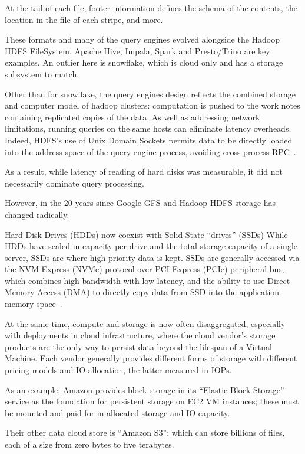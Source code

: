 \documentclass[manuscript]{acmart}
\begin{document}
At the tail of each file, footer information defines the schema of the contents, the location in the file of each stripe, and more.

These formats and many of the query engines evolved alongside the Hadoop HDFS FileSystem.
Apache Hive, Impala, Spark and Presto/Trino are key examples.
An outlier here is snowflake, which is cloud only and has a storage subsystem to match.

Other than for snowflake, the query engines design reflects the combined storage and computer
model of hadoop clusters: computation is pushed to the work notes containing replicated copies of
the data.
As well as addressing network limitations, running queries on the same hosts can
eliminate latency overheads.
Indeed, HDFS's use of Unix Domain Sockets permits data to be directly loaded into the address
space of the query engine process, avoiding cross process RPC~\cite{hdfs-short-circuit-local-reads}.

As a result, while latency of reading of hard disks was measurable, it did not necessarily dominate query processing.

However, in the 20 years since Google GFS and Hadoop HDFS storage has changed radically.

Hard Disk Drives (HDDs) now coexist with Solid State ``drives'' (SSDs)
While HDDs have scaled in capacity per drive and the total storage capacity of a single server,
SSDs are where high priority data is kept.
SSDs are generally accessed via the NVM Express (NVMe) protocol over PCI Express (PCIe) peripheral bus, which
combines high bandwidth with low latency, and the ability to use Direct Memory Access (DMA) to directly copy
data from SSD into the application memory space~\cite{app13020960}.

At the same time, compute and storage is now often disaggregated, especially with deployments
in cloud infrastructure, where the cloud vendor's storage products are the only way to
persist data beyond the lifespan of a Virtual Machine.
Each vendor generally provides different forms of storage with different pricing models and IO allocation,
the latter measured in IOPs.

As an example, Amazon provides block storage in its ``Elastic Block Storage'' service as the foundation
for persistent storage on EC2 VM instances; these must be mounted and paid for in allocated storage and
IO capacity.

Their other data cloud store is ``Amazon S3''; which can store billions of files, each of a size
from zero bytes to five terabytes.
\end{document}
